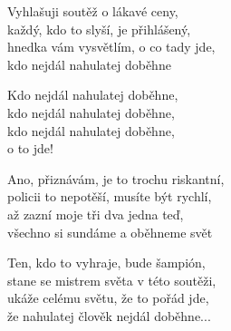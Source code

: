 
\ve{}
Vyhlašuji soutěž o lákavé ceny,\\
každý, kdo to slyší, je přihlášený,\\
hnedka vám vysvětlím, o co tady jde,\\
kdo nejdál nahulatej doběhne

\cho{}
Kdo nejdál nahulatej doběhne,\\
kdo nejdál nahulatej doběhne,\\
kdo nejdál nahulatej doběhne,\\
o to jde!

\ve{}
Ano, přiznávám, je to trochu riskantní,\\
policii to nepotěší, musíte být rychlí,\\
až zazní moje tři dva jedna teď,\\
všechno si sundáme a oběhneme svět

\cho{}
 
\ve{}
Ten, kdo to vyhraje, bude šampión,\\
stane se mistrem světa v této soutěži,\\
ukáže celému světu, že to pořád jde,\\
že nahulatej člověk nejdál doběhne...

\cho{}

\esong{}